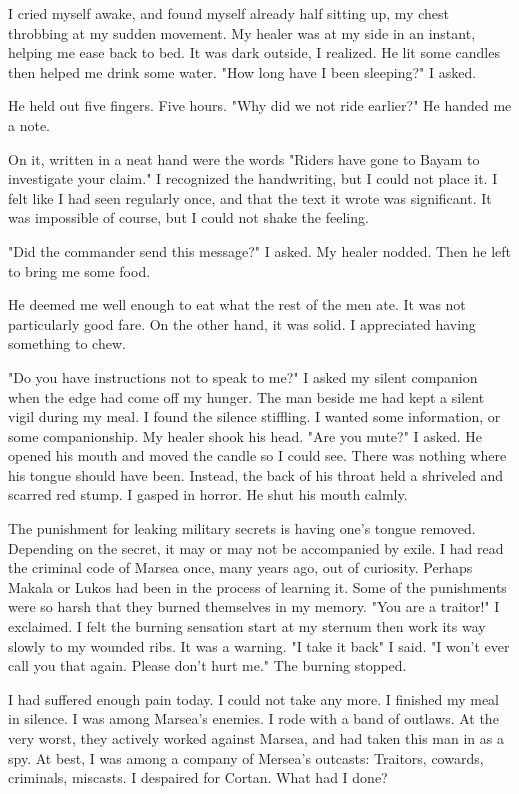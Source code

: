 \documentclass{article}
\begin{document}
I cried myself awake, and found myself already half sitting up, my chest throbbing at my sudden movement. My healer was at my side in an instant, helping me ease back to bed. It was dark outside, I realized. He lit some candles then helped me drink some water. "How long have I been sleeping?" I asked. 

He held out five fingers. Five hours. "Why did we not ride earlier?" He handed me a note.

On it, written in a neat hand were the words "Riders have gone to Bayam to investigate your claim." I recognized the handwriting, but I could not place it. I felt like I had seen regularly once, and that the text it wrote was significant. It was impossible of course, but I could not shake the feeling. 

"Did the commander send this message?" I asked. My healer nodded. Then he left to bring me some food.

He deemed me well enough to eat what the rest of the men ate. It was not particularly good fare. On the other hand, it was solid. I appreciated having something to chew. 

"Do you have instructions not to speak to me?" I asked my silent companion when the edge had come off my hunger. The man beside me had kept a silent vigil during my meal. I found the silence stiffling. I wanted some information, or some companionship. My healer shook his head. "Are you mute?" I asked. He opened his mouth and moved the candle so I could see. There was nothing where his tongue should have been. Instead, the back of his throat held a shriveled and scarred red stump. I gasped in horror. He shut his mouth calmly.

The punishment for leaking military secrets is having one's tongue removed. Depending on the secret, it may or may not be accompanied by exile. I had read the criminal code of Marsea once, many years ago, out of curiosity. Perhaps Makala or Lukos had been in the process of learning it. Some of the punishments were so harsh that they burned themselves in my memory. "You are a traitor!" I exclaimed. I felt the burning sensation start at my sternum then work its way slowly to my wounded ribs. It was a warning. "I take it back" I said. "I won't ever call you that again. Please don't hurt me." The burning stopped.

I had suffered enough pain today. I could not take any more. I finished my meal in silence. I was among Marsea's enemies. I rode with a band of outlaws. At the very worst, they actively worked against Marsea, and had taken this man in as a spy. At best, I was among a company of Mersea's outcasts: Traitors, cowards, criminals, miscasts. I despaired for Cortan. What had I done?
\end{document}
